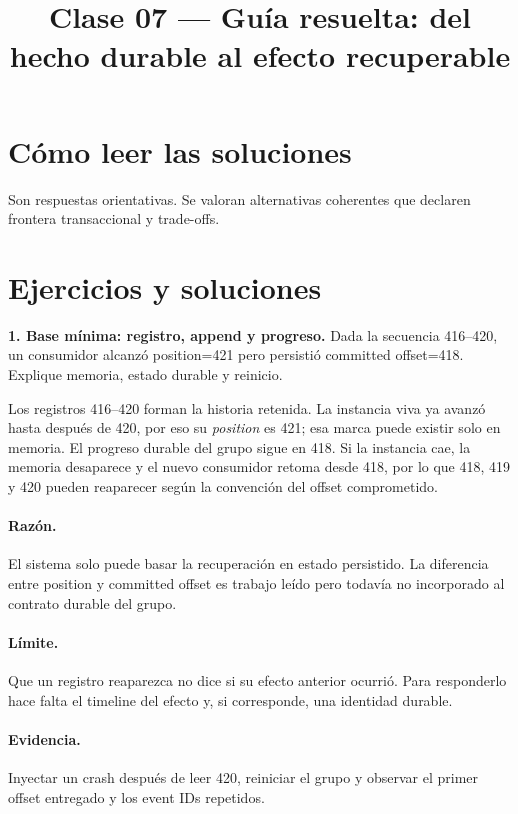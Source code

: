 \documentclass[variant=guiaresuelta,cover=institutional,mode=screen]{ua-engineering-v6-article}
\title{Clase 07 --- Guía resuelta: del hecho durable al efecto recuperable}
\author{\UAProfessor}
\date{\UADate}
\begin{document}
\maketitle
\section{Cómo leer las soluciones}
Son respuestas orientativas. Se valoran alternativas coherentes que declaren frontera transaccional y trade-offs.
\section{Ejercicios y soluciones}
\begin{uaexercise}
\textbf{1. Base mínima: registro, append y progreso.} Dada la secuencia 416--420, un consumidor alcanzó position=421 pero persistió committed offset=418. Explique memoria, estado durable y reinicio.
\end{uaexercise}
\begin{uaanswer}
Los registros 416--420 forman la historia retenida. La instancia viva ya avanzó hasta después de 420, por eso su \emph{position} es 421; esa marca puede existir solo en memoria. El progreso durable del grupo sigue en 418. Si la instancia cae, la memoria desaparece y el nuevo consumidor retoma desde 418, por lo que 418, 419 y 420 pueden reaparecer según la convención del offset comprometido.

\paragraph{Razón.} El sistema solo puede basar la recuperación en estado persistido. La diferencia entre position y committed offset es trabajo leído pero todavía no incorporado al contrato durable del grupo.

\paragraph{Límite.} Que un registro reaparezca no dice si su efecto anterior ocurrió. Para responderlo hace falta el timeline del efecto y, si corresponde, una identidad durable.

\paragraph{Evidencia.} Inyectar un crash después de leer 420, reiniciar el grupo y observar el primer offset entregado y los event IDs repetidos.
\end{uaanswer}
\end{document}
